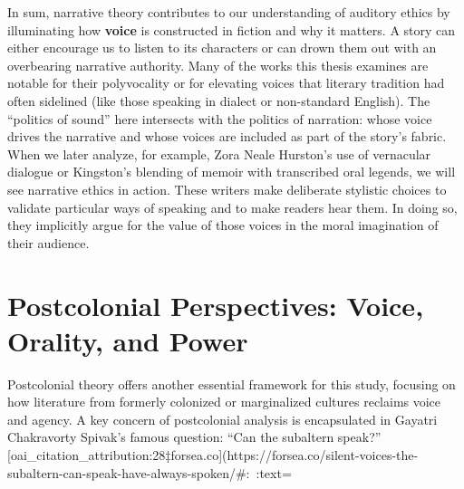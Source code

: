 \documentclass[12pt]{report}
\begin{document}
In sum, narrative theory contributes to our understanding of auditory ethics by illuminating how \textbf{voice} is constructed in fiction and why it matters. A story can either encourage us to listen to its characters or can drown them out with an overbearing narrative authority. Many of the works this thesis examines are notable for their polyvocality or for elevating voices that literary tradition had often sidelined (like those speaking in dialect or non-standard English). The “politics of sound” here intersects with the politics of narration: whose voice drives the narrative and whose voices are included as part of the story’s fabric. When we later analyze, for example, Zora Neale Hurston’s use of vernacular dialogue or Kingston’s blending of memoir with transcribed oral legends, we will see narrative ethics in action. These writers make deliberate stylistic choices to validate particular ways of speaking and to make readers hear them. In doing so, they implicitly argue for the value of those voices in the moral imagination of their audience.

\section{Postcolonial Perspectives: Voice, Orality, and Power}
Postcolonial theory offers another essential framework for this study, focusing on how literature from formerly colonized or marginalized cultures reclaims voice and agency. A key concern of postcolonial analysis is encapsulated in Gayatri Chakravorty Spivak’s famous question: “Can the subaltern speak?” [oai_citation_attribution:28‡forsea.co](https://forsea.co/silent-voices-the-subaltern-can-speak-have-always-spoken/#:~:text=%
\end{document}
